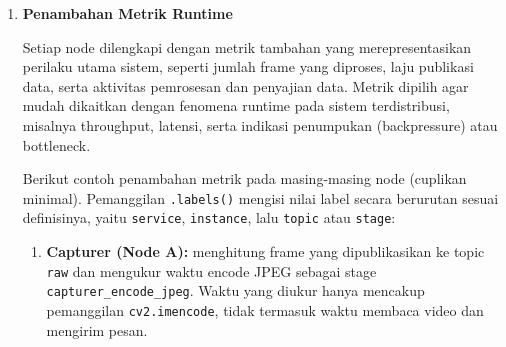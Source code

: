 \begin{enumerate}
Setiap node kemudian mengimpor shared library ini dan menjalankan server metrik. Listing~\ref{lst:ch02-4} menunjukkan pola tersebut pada berkas \texttt{capturer/capturer.py}. Broker, transformer, dan web server memakai pola yang sama dengan nama layanan dan port masing-masing:

\begin{lstlisting}[style=PythonStyle, breakatwhitespace=true, caption={Potongan kode pada Tahapan Eksperimen}, label={lst:ch02-4}]
from shared.observability import (  # noqa: E402
    init as obs_init,
    SERVICE as OBS_SERVICE,
    INSTANCE as OBS_INSTANCE,
    FRAMES_OUT,
    BYTES_OUT,
    JPEG_BYTES,
    STAGE_SECONDS,
    ERRORS,
)
# ...
METRICS_PORT = validate_port(getenv_int("METRICS_PORT", 9101), "METRICS_PORT")
# ...
def main() -> int:
    # Start Prometheus metrics
    obs_init(service="capturer", metrics_port=METRICS_PORT)
\end{lstlisting}

Dengan pola ini, ekspor metrik menjadi seragam: setiap node menjalankan endpoint \texttt{/metrics} dan menggunakan definisi metrik yang sama melalui shared library. Port endpoint dibaca dari variabel lingkungan \texttt{METRICS\_PORT}, yang pada \texttt{docker-compose.yml} bernilai 9101 untuk capturer, 9102 untuk broker, 9103 untuk transformer, dan 9104 untuk web server.

\item \textbf{Penambahan Metrik Runtime}  

Setiap node dilengkapi dengan metrik tambahan yang merepresentasikan perilaku utama sistem, seperti jumlah frame yang diproses, laju publikasi data, serta aktivitas pemrosesan dan penyajian data. Metrik dipilih agar mudah dikaitkan dengan fenomena runtime pada sistem terdistribusi, misalnya throughput, latensi, serta indikasi penumpukan (backpressure) atau bottleneck.

Berikut contoh penambahan metrik pada masing-masing node (cuplikan minimal). Pemanggilan \texttt{.labels()} mengisi nilai label secara berurutan sesuai definisinya, yaitu \texttt{service}, \texttt{instance}, lalu \texttt{topic} atau \texttt{stage}:

\begin{enumerate}
  \item \textbf{Capturer (Node A):} menghitung frame yang dipublikasikan ke topic \texttt{raw} dan mengukur waktu encode JPEG sebagai stage \texttt{capturer\_encode\_jpeg}. Waktu yang diukur hanya mencakup pemanggilan \texttt{cv2.imencode}, tidak termasuk waktu membaca video dan mengirim pesan.


\end{enumerate}
\end{enumerate}
